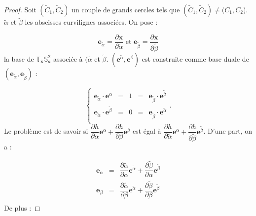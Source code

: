 \begin{proof}
Soit $(\tilde{C}_1, \tilde{C}_2)$ un couple de grands cercles tels que  $(\tilde{C}_1, \tilde{C}_2) \neq (C_1, C_2$). $\tilde{\alpha}$ et $\tilde{\beta}$ les abscisses curvilignes associées. On pose :

\begin{equation}
\mathbf{e}_{\tilde{\alpha}} = \dfrac{\partial \mathbf{x}}{\partial \tilde{\alpha}} \text{ et } \mathbf{e}_{\tilde{\beta}} = \dfrac{\partial \mathbf{x}}{\partial \tilde{\beta}}
\end{equation}
la base de $\mathbb{T}_{\overline{\mathbf{x}}}\mathbb{S}_a^2$ associée à $(\tilde{\alpha}$ et $\tilde{\beta}$. $\left( \mathbf{e}^{\tilde{\alpha}}, \mathbf{e}^{\tilde{\beta}} \right)$ est construite comme base duale de $\left( \mathbf{e}_{\tilde{\alpha}}, \mathbf{e}_{\tilde{\beta}} \right)$ :

\begin{equation}
\left\lbrace
\begin{array}{rcccl}
\mathbf{e}_{\tilde{\alpha}} \cdot \mathbf{e}^{\tilde{\alpha}} & = & 1 & = & \mathbf{e}_{\tilde{\beta}} \cdot \mathbf{e}^{\tilde{\beta}} \\
\mathbf{e}_{\tilde{\alpha}} \cdot \mathbf{e}^{\tilde{\beta}} & = & 0 & = & \mathbf{e}_{\tilde{\beta}} \cdot \mathbf{e}^{\tilde{\alpha}} \\
\end{array}
\right. .
\end{equation}
Le problème est de savoir si $\dfrac{\partial h}{\partial \alpha} \mathbf{e}^{\alpha} + \dfrac{\partial h}{\partial \beta} \mathbf{e}^{\beta}$ est égal à $\dfrac{\partial h}{\partial \tilde{\alpha}} \mathbf{e}^{\tilde{\alpha}} + \dfrac{\partial h}{\partial \tilde{\beta}} \mathbf{e}^{\tilde{\beta}}$.
D'une part, on a :

\begin{equation}
\begin{array}{rcl}
\mathbf{e}_{\alpha} & = & \dfrac{\partial \tilde{\alpha}}{\partial \alpha} \mathbf{e}^{\tilde{\alpha}} + \dfrac{\partial \tilde{\beta}}{\partial \alpha} \mathbf{e}^{\tilde{\beta}} \\
\mathbf{e}_{\beta} & = & \dfrac{\partial \tilde{\alpha}}{\partial \beta} \mathbf{e}^{\tilde{\alpha}} + \dfrac{\partial \tilde{\beta}}{\partial \beta} \mathbf{e}^{\tilde{\beta}} \\
\end{array}
\end{equation}
De plus :


\end{proof}
